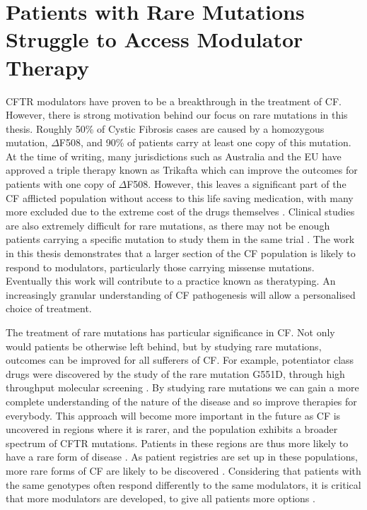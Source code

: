 \section{Patients with Rare Mutations Struggle to Access Modulator Therapy}
CFTR modulators have proven to be a breakthrough in the treatment of CF. However, there is strong motivation behind our focus on rare mutations in this thesis. Roughly 50\% of Cystic Fibrosis cases are caused by a homozygous mutation, $\Delta$F508, and 90\% of patients carry at least one copy of this mutation. At the time of writing, many jurisdictions such as Australia and the EU have approved a triple therapy known as Trikafta which can improve the outcomes for patients with one copy of $\Delta$F508. However, this leaves a significant part of the CF afflicted population without access to this life saving medication, with many more excluded due to the extreme cost of the drugs themselves \cite{administration2021, trikafta_website, abdallah2021, guo2022a}. Clinical studies are also extremely difficult for rare mutations, as there may not be enough patients carrying a specific mutation to study them in the same trial \cite{grody2007}. The work in this thesis demonstrates that a larger section of the CF population is likely to respond to modulators, particularly those carrying missense mutations. Eventually this work will contribute to a practice known as theratyping. An increasingly granular understanding of CF pathogenesis will allow a personalised choice of treatment.

The treatment of rare mutations has particular significance in CF. Not only would patients be otherwise left behind, but by studying rare mutations, outcomes can be improved for all sufferers of CF. For example, potentiator class drugs were discovered by the study of the rare mutation G551D, through high throughput molecular screening \cite{vangoor2009}. By studying rare mutations we can gain a more complete understanding of the nature of the disease and so improve therapies for everybody. This approach will become more important in the future as CF is uncovered in regions where it is rarer, and the population exhibits a broader spectrum of CFTR mutations. Patients in these regions are thus more likely to have a rare form of disease \cite{singh2015,zheng2017,ni2022}. As patient registries are set up in these populations, more rare forms of CF are likely to be discovered \cite{zheng2017}. Considering that patients with the same genotypes often respond differently to the same modulators, it is critical that more modulators are developed, to give all patients more options \cite{hanafin2021}.

